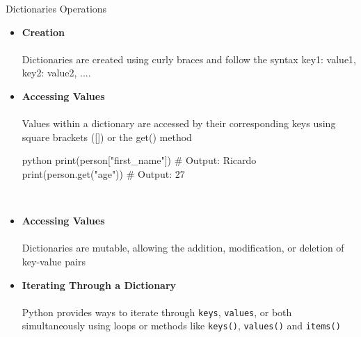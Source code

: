 \documentclass[
	11pt, 
]{beamer}
\begin{document}
\begin{frame}[fragile]{Dictionaries Operations}

\begin{itemize}
    \item \textbf{Creation} \\ \\
    Dictionaries are created using curly braces {} and follow the syntax {key1: value1, key2: value2, ...}.
    
    \item \textbf{Accessing Values} \\ \\
    Values within a dictionary are accessed by their corresponding keys using square brackets ([]) or the get() method

\begin{mintedbox}{python}
print(person["first_name"])  # Output: Ricardo
print(person.get("age"))  # Output: 27
\end{mintedbox}
    \\
    \item \textbf{Accessing Values} \\ \\
     Dictionaries are mutable, allowing the addition, modification, or deletion of key-value pairs

    \item \textbf{ Iterating Through a Dictionary} \\ \\
     Python provides ways to iterate through \texttt{keys}, \texttt{values}, or both simultaneously using loops or methods like \texttt{keys()}, \texttt{values()} and \texttt{items()}
\end{itemize}
\end{frame}

\end{document}
